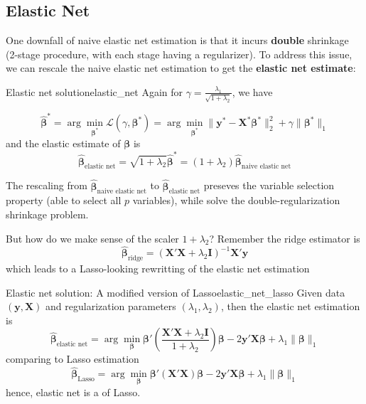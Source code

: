 \documentclass[twoside]{article}
\begin{document}
\subsection{Elastic Net}
One downfall of naive elastic net estimation is that it incurs \textbf{double} shrinkage (2-stage procedure, with each stage having a regularizer). To address this issue, we can rescale the naive elastic net estimation to get the \textbf{elastic net estimate}:
\begin{definition}{Elastic net solution}{elastic_net}
    Again for $\gamma = \frac{\lambda_1}{\sqrt{1+\lambda_2}}$, we have

    $$
    \hat{\boldsymbol{\beta}}^* = \arg\min_{\boldsymbol{\beta}^*} \mathcal{L}(\gamma,\boldsymbol{\beta}^*) = \arg\min_{\boldsymbol{\beta}^*} \lVert \mathbf{y}^*-\mathbf{X}^*\boldsymbol{\beta}^* \rVert _2^2 + \gamma \lVert \boldsymbol{\beta}^* \rVert _1 
    $$
    and the elastic estimate of $\mathbf{\beta}$ is 
    $$
    \hat{\boldsymbol{\beta}}_{\text{elastic net}} = \sqrt{1+\lambda_2}\hat{\boldsymbol{\beta}}^* = (1+\lambda_2)\hat{\boldsymbol{\beta}}_{\text{naive elastic net}}
    $$
\end{definition}
The rescaling from $\hat{\boldsymbol{\beta}}_{\text{naive elastic net}}$ to $\hat{\boldsymbol{\beta}}_{\text{elastic net}}$ preseves the variable selection property (able to select all $p$ variables), while solve the double-regularization shrinkage problem. 

But how do we make sense of the scaler $1+\lambda_2$? Remember the ridge estimator is
$$
\hat{\boldsymbol{\beta}}_{\text{ridge}} = \left( \mathbf{X}'\mathbf{X}+\lambda_2 \mathbf{I} \right)^{-1}\mathbf{X}'\mathbf{y}
$$
which leads to a Lasso-looking rewritting of the elastic net estimation
\begin{theorem}{Elastic net solution: A modified version of Lasso}{elastic_net_lasso}
    Given data $(\mathbf{y},\mathbf{X})$ and regularization parameters $(\lambda_1,\lambda_2)$, then the elastic net estimation is
    $$
\hat{\boldsymbol{\beta}}_{\text{elastic net}} = \arg\min_{\boldsymbol{\beta}}\boldsymbol{\beta}'\left(\frac{\mathbf{X}'\mathbf{X}+\lambda_2 \mathbf{I} }{1+\lambda_2}\right)\boldsymbol{\beta} - 2\mathbf{y}'\mathbf{X}\boldsymbol{\beta} + \lambda_1\lVert \boldsymbol{\beta} \rVert _1
    $$
    comparing to Lasso estimation
    $$
    \hat{\boldsymbol{\beta}}_{\text{Lasso}} = \arg\min_{\boldsymbol{\beta}}\boldsymbol{\beta}'\left(\mathbf{X}'\mathbf{X}\right)\boldsymbol{\beta} - 2\mathbf{y}'\mathbf{X}\boldsymbol{\beta} + \lambda_1\lVert \boldsymbol{\beta} \rVert _1
    $$
    hence, elastic net is a  of Lasso.
\end{theorem}
\end{document}
